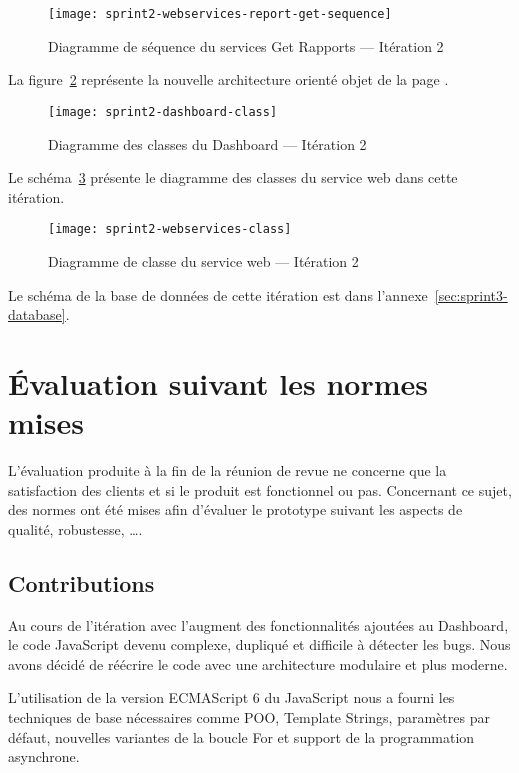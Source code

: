 \begin{figure}[H]
    \centering
    \texttt{[image: sprint2-webservices-report-get-sequence]}
    \caption{Diagramme de séquence du services Get Rapports --- Itération 2}
\label{fig:sprint2-webservices-report-get-sequence}
\end{figure}

La figure~\ref{fig:sprint2-dashboard-class} représente la nouvelle architecture
orienté objet de la page .

\begin{figure}[H]
    \centering
    \texttt{[image: sprint2-dashboard-class]}
    \caption{Diagramme des classes du Dashboard --- Itération 2}
\label{fig:sprint2-dashboard-class}
\end{figure}

Le schéma~\ref{fig:sprint2-webservices-class} présente le diagramme des classes
du service web dans cette itération.

\begin{figure}[H]
    \centering
    \texttt{[image: sprint2-webservices-class]}
    \caption{Diagramme de classe du service web --- Itération 2}
\label{fig:sprint2-webservices-class}
\end{figure}

Le schéma de la base de données de cette itération est dans
l'annexe~\ref{sec:sprint3-database}.

\section{Évaluation suivant les normes mises}

L'évaluation produite à la fin de la réunion de revue ne concerne que la
satisfaction des clients et si le produit est fonctionnel ou pas. Concernant ce
sujet, des normes ont été mises afin d'évaluer le prototype suivant les aspects
de qualité, robustesse, \ldots.

\subsection{Contributions}

Au cours de l'itération avec l'augment des fonctionnalités ajoutées au
Dashboard, le code JavaScript devenu complexe, dupliqué et difficile à détecter
les bugs. Nous avons décidé de réécrire le code avec une architecture modulaire
et plus moderne.

L'utilisation de la version ECMAScript 6 du JavaScript nous a fourni les
techniques de base nécessaires comme POO, Template Strings, paramètres par
défaut, nouvelles variantes de la boucle For et support de la programmation
asynchrone.

